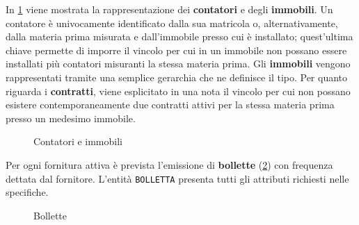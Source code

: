\documentclass[a4paper,12pt]{report}
\begin{document}
In \cref{fig:meters_premises} viene mostrata la rappresentazione dei \textbf{contatori} e degli \textbf{immobili}. Un contatore è univocamente identificato dalla sua matricola o, alternativamente, dalla materia prima misurata e dall'immobile presso cui è installato; quest'ultima chiave permette di imporre il vincolo per cui in un immobile non possano essere installati più contatori misuranti la stessa materia prima.
\newline
Gli \textbf{immobili} vengono rappresentati tramite una semplice gerarchia che ne definisce il tipo.
\newline
Per quanto riguarda i \textbf{contratti}, viene esplicitato in una nota il vincolo per cui non possano esistere contemporaneamente due contratti attivi per la stessa materia prima presso un medesimo immobile.

\begin{figure}[H]
\centering{}
\caption{Contatori e immobili}
\label{fig:meters_premises}
\end{figure}

Per ogni fornitura attiva è prevista l'emissione di \textbf{bollette} (\cref{fig:reports}) con frequenza dettata dal fornitore. L'entità \texttt{BOLLETTA} presenta tutti gli attributi richiesti nelle specifiche.

\begin{figure}[H]
\centering{}
\caption{Bollette}
\label{fig:reports}
\end{figure}
\end{document}
